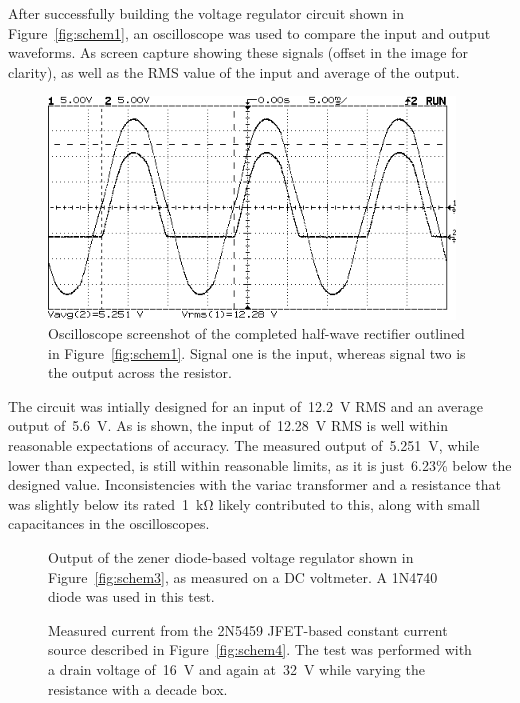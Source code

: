 After successfully building the voltage regulator circuit shown in
Figure~\ref{fig:schem1}, an oscilloscope was used to compare the input and
output waveforms.  As screen capture showing these signals (offset in the image
for clarity), as well as the RMS value of the input and average of the output.
%
\begin{figure}[H]
	\centering
	\includegraphics[width=4.25in]{img/ss1.png}
	\parbox{4.25in}{\caption{Oscilloscope screenshot of the completed half-wave rectifier
		outlined in Figure~\ref{fig:schem1}.  Signal one is the input, whereas
		signal two is the output across the resistor.}
	\label{fig:ck1plot}}
\end{figure}
%
The circuit was intially designed for an input of~\SI{12.2}{\volt} RMS and an
average output of~\SI{5.6}{\volt}.  As is shown, the input of~\SI{12.28}{\volt}
RMS is well within reasonable expectations of accuracy.  The measured output
of~\SI{5.251}{\volt}, while lower than expected, is still within reasonable
limits, as it is just~6.23\% below the designed value.  Inconsistencies with
the variac transformer and a resistance that was slightly below its
rated~\SI{1}{\kilo\ohm} likely contributed to this, along with small
capacitances in the oscilloscopes.

\begin{figure}[H]
	\centering
	
	\parbox{4.25in}{
	\caption{Output of the zener diode-based voltage regulator shown in
		Figure~\ref{fig:schem3}, as measured on a DC voltmeter.  A 1N4740 diode
		was used in this test.}
	\label{fig:ckt3plot}}
\end{figure}

\begin{figure}[H]
	\centering
	
	\parbox{4.25in}{
	\caption{Measured current from the 2N5459 JFET-based constant current
		source described in Figure~\ref{fig:schem4}.  The test was performed
		with a drain voltage of~\SI{16}{\volt} and again at~\SI{32}{\volt}
		while varying the resistance with a decade box.}
	\label{fig:ckt4plot}}
\end{figure}
